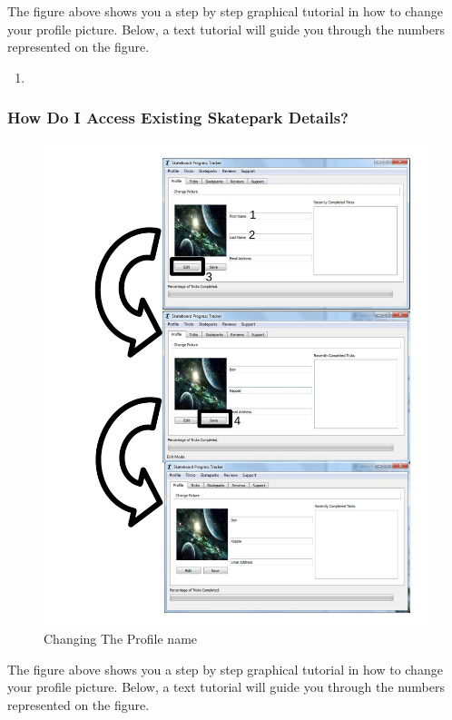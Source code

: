 The figure above shows you a step by step graphical tutorial in how to change your profile picture. Below, a text tutorial will guide you through the numbers represented on the figure.

\begin{enumerate}
\item
\end{enumerate}

\subsubsection{How Do I Access Existing Skatepark Details?}

\begin{figure}[H]
    \includegraphics[width=\textwidth]{./Manual/Images/ChangeName.pdf}
    \caption{Changing The Profile name} \label{fig:Change Name}
\end{figure}

The figure above shows you a step by step graphical tutorial in how to change your profile picture. Below, a text tutorial will guide you through the numbers represented on the figure.

